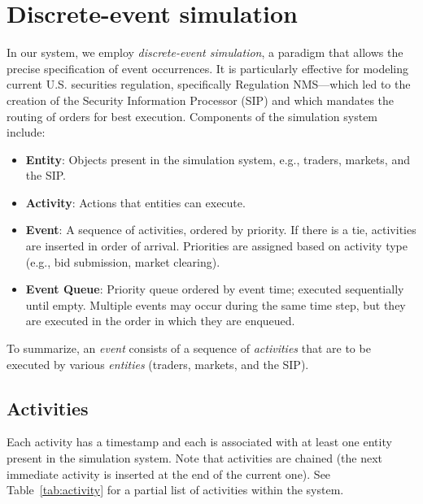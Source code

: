 \documentclass[11pt]{article}
\begin{document}
\section{Discrete-event simulation}

In our system, we employ \emph{discrete-event simulation}, a paradigm that allows the precise specification of event occurrences. It is particularly effective for modeling current U.S. securities regulation, specifically Regulation NMS---which led to the creation of the Security Information Processor (SIP) and which mandates the routing of orders for best execution.
Components of the simulation system include:

\begin{itemize}
\item \textbf{Entity}: Objects present in the simulation system, e.g., traders, markets, and the SIP.

\item \textbf{Activity}: Actions that entities can execute.

\item \textbf{Event}: A sequence of activities, ordered by priority. If there is a tie, activities are inserted in order of arrival.
Priorities are assigned based on activity type (e.g., bid submission, market clearing).

\item \textbf{Event Queue}: Priority queue ordered by event time; executed sequentially until empty. Multiple events may occur during the same time step, but they are executed in the order in which they are enqueued.

\end{itemize}
%
To summarize, an \emph{event} consists of a sequence of \emph{activities} that are to be executed by various \emph{entities} (traders, markets, and the SIP).


\subsection{Activities}

Each activity has a timestamp and each is associated with at least one entity present in the simulation system. Note that activities are chained (the next immediate activity is inserted at the end of the current one). See Table~\ref{tab:activity} for a partial list of activities within the system.
\end{document}
